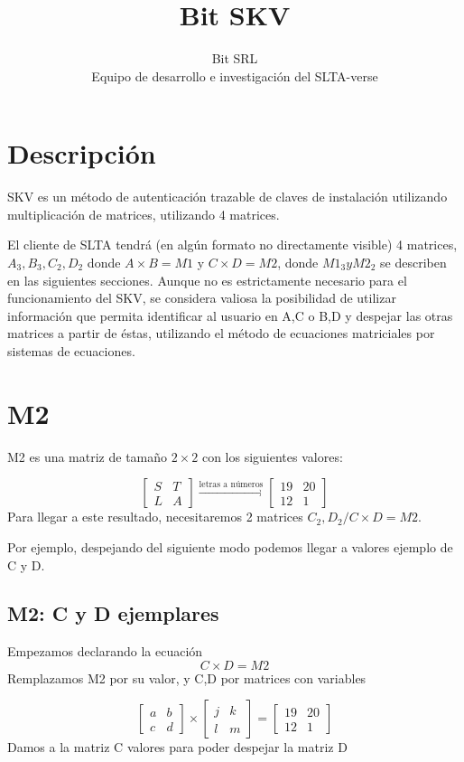 \documentclass[11pt]{article}
\title{\textbf{Bit SKV}}
\author{Bit SRL\\
		Equipo de desarrollo e investigación del SLTA-verse}
\date{}
\begin{document}
\maketitle

\section{Descripción}
SKV es un método de autenticación trazable de claves de instalación utilizando multiplicación de matrices, utilizando 4 matrices.

El cliente de SLTA tendrá (en algún formato no directamente visible) 4 matrices, $ A_{3}, B_{3}, C_{2}, D_{2} $ donde $ A \times B = M1$ y $ C \times D = M2 $, donde $M1_{3} y M2_{2}$ se describen en las siguientes secciones. Aunque no es estrictamente necesario para el funcionamiento del SKV, se considera valiosa la posibilidad de utilizar información que permita identificar al usuario en A,C o B,D y despejar las otras matrices a partir de éstas, utilizando el método de ecuaciones matriciales por sistemas de ecuaciones\cite{gonzalez2019}.

\section{M2}
M2 es una matriz de tamaño $2\times2$ con los siguientes valores:

\[
\begin{bmatrix}
S & T \\
L & A
\end{bmatrix}
\xrightarrow{\text{letras a números}}
\begin{bmatrix}
19 & 20 \\
12 & 1
\end{bmatrix}
\]
Para llegar a este resultado, necesitaremos 2 matrices $C_{2}, D_{2} / C \times D = M2$.

Por ejemplo, despejando del siguiente modo podemos llegar a valores ejemplo de C y D.
\newpage
\subsection{M2: C y D ejemplares}
Empezamos declarando la ecuación
\[
C \times D = M2
\]
Remplazamos M2 por su valor, y C,D por matrices con variables

\[
\begin{bmatrix}
a & b \\
c & d
\end{bmatrix}
\times
\begin{bmatrix}
j & k \\
l & m
\end{bmatrix}
=
\begin{bmatrix}
19 & 20 \\
12 & 1
\end{bmatrix}
\]
Damos a la matriz C valores para poder despejar la matriz D
\end{document}
